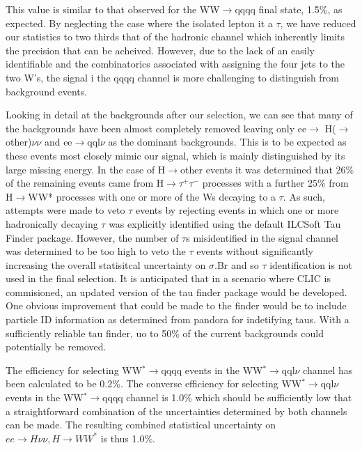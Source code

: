 This value is similar to that observed for the WW$\rightarrow$qqqq final state, 1.5\%, as expected. By neglecting the case where the isolated lepton it a $\tau$, we have reduced our statistics to two thirds that of the hadronic channel which inherently limits the precision that can be acheived. However, due to the lack of an easily identifiable and the combinatorics associated with assigning the four jets to the two W's, the signal i the qqqq channel is more challenging to distinguish from background events.

Looking in detail at the backgrounds after our selection, we can see that many of the backgrounds have been almost completely removed leaving only ee$\rightarrow$ H($\rightarrow$ other)$\nu\nu$ and ee$\rightarrow$qql$\nu$ as the dominant backgrounds. This is to be expected as these events most closely mimic our signal, which is mainly distinguished by its large missing energy. In the case of H$\rightarrow$other events it was determined that 26\% of the remaining events came from H$\rightarrow\tau^+\tau^-$ processes with a further 25\% from H$\rightarrow$WW* processes with one or more of the Ws decaying to a $\tau$. As such, attempts were made to veto $\tau$ events by rejecting events in which one or more hadronically decaying $\tau$ was explicitly identified using the default ILCSoft Tau Finder \cite{TauFinder} package. However, the number of $\tau$s misidentified in the signal channel was determined to be too high to veto the $\tau$ events without significantly increasing the overall statisitcal uncertainty on $\sigma.$Br and so $\tau$ identification is not used in the final selection. It is anticipated that in a scenario where \ac{CLIC} is commisioned, an updated version of the tau finder package would be developed. One obvious improvement that could be made to the finder would be to include particle ID information as determined from pandora for indetifying taus. With a sufficiently reliable tau finder, uo to 50\% of the current backgrounds could potentially be removed. 

The efficiency for selecting WW$^*\rightarrow$qqqq events in the WW$^*\rightarrow$qql$\nu$ channel has been calculated to be 0.2\%. The converse efficiency for selecting WW$^*\rightarrow$qql$\nu$ events in the WW$^*\rightarrow$qqqq channel is 1.0\% which should be sufficiently low that a straightforward combination of the uncertainties determined by both channels can be made. The resulting combined statistical uncertainty on $ee\rightarrow H\nu\nu, H\rightarrow WW^*$ is thus 1.0\%.

